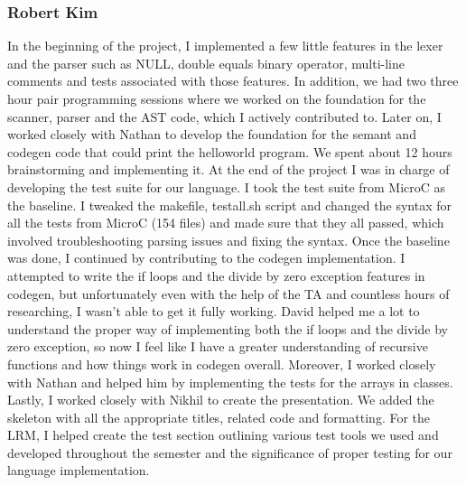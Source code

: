 \documentclass{article}
\begin{document}
\subsubsection{Robert Kim}
In the beginning of the project, I implemented a few little features in the lexer and the parser such as NULL, double equals binary operator, multi-line comments and tests associated with those features. In addition, we had two three hour pair programming sessions where we worked on the foundation for the scanner, parser and the AST code, which I actively contributed to. Later on, I worked closely with Nathan to develop the foundation for the semant and codegen code that could print the helloworld program. We spent about 12 hours brainstorming and implementing it. At the end of the project I was in charge of developing the test suite for our language. I took the test suite from MicroC as the baseline. I tweaked the makefile, testall.sh script and changed the syntax for all the tests from MicroC (154 files) and made sure that they all passed, which involved troubleshooting parsing issues and fixing the syntax. Once the baseline was done, I continued by contributing to the codegen implementation. I attempted to write the if loops and the divide by zero exception features in codegen, but unfortunately even with the help of the TA and countless hours of researching, I wasn't able to get it fully working. David helped me a lot to understand the proper way of implementing both the if loops and the divide by zero exception, so now I feel like I have a greater understanding of recursive functions and how things work in codegen overall. Moreover, I worked closely with Nathan and helped him by implementing the tests for the arrays in classes. Lastly, I worked closely with Nikhil to create the presentation. We added the skeleton with all the appropriate titles, related code and formatting. For the LRM, I helped create the test section outlining various test tools we used and developed throughout the semester and the significance of proper testing for our language implementation.
\end{document}
